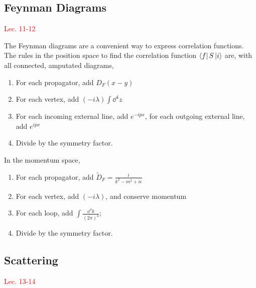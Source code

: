 \documentclass{article}
\begin{document}
\subsection{Feynman Diagrams}
\textcolor{red}{Lec. 11-12}

The Feynman diagrams are a convenient way to express correlation functions. The rules in the position space to find the correlation function $\bra fS\ket i$ are, with all connected, amputated  diagrams, 
\begin{enumerate}
    \item For each propagator, add $D_F(x-y)$
    \item For each vertex, add $(-i\lambda)\int\dd^4z$
    \item For each incoming external line, add $e^{-ipx}$, for each outgoing external line, add $e^{ipx}$
    \item Divide by the symmetry factor.
\end{enumerate}
In the momentum space, 
\begin{enumerate}
    \item For each propagator, add $\tilde D_F=\frac{i}{k^2-m^2+i\epsilon}$
    \item For each vertex, add $(-i\lambda)$, and conserve momentum
    \item For each loop, add $\int\frac{\dd^4k}{(2\pi)^4}$;
    \item Divide by the symmetry factor.
\end{enumerate}


\subsection{Scattering}
\textcolor{red}{Lec. 13-14}
\end{document}
